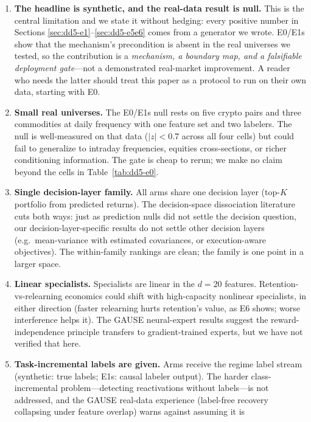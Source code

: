 \documentclass[11pt,a4paper]{article}
\theoremstyle{definition}
\theoremstyle{plain}
\begin{document}
\begin{enumerate}
\item \textbf{The headline is synthetic, and the real-data result is null.}
This is the central limitation and we state it without hedging: every
positive number in Sections \ref{sec:dd5-e1}--\ref{sec:dd5-e5e6} comes from
a generator we wrote. E0/E1s show that the mechanism's precondition is
absent in the real universes we tested, so the contribution is a
\emph{mechanism, a boundary map, and a falsifiable deployment gate}---not a
demonstrated real-market improvement. A reader who needs the latter should
treat this paper as a protocol to run on their own data, starting with E0.
\item \textbf{Small real universes.} The E0/E1s null rests on five crypto
pairs and three commodities at daily frequency with one feature set and two
labelers. The null is well-measured on that data ($|z| < 0.7$ across all
four cells) but could fail to generalize to intraday frequencies, equities
cross-sections, or richer conditioning information. The gate is cheap to
rerun; we make no claim beyond the cells in Table~\ref{tab:dd5-e0}.
\item \textbf{Single decision-layer family.} All arms share one decision
layer (top-$K$ portfolio from predicted returns). The decision-space
dissociation literature \citep{elmachtoub2022smart,yan2026invpnco} cuts
both ways: just as prediction nulls did not settle the decision question,
our decision-layer-specific results do not settle other decision layers
(e.g.\ mean-variance with estimated covariances, or execution-aware
objectives). The within-family rankings are clean; the family is one
point in a larger space.
\item \textbf{Linear specialists.} Specialists are linear in the $d = 20$
features. Retention-vs-relearning economics could shift with
high-capacity nonlinear specialists, in either direction (faster relearning
hurts retention's value, as E6 shows; worse interference helps it). The
GAUSE neural-expert results \citep{li2026gause} suggest the
reward-independence principle transfers to gradient-trained experts, but
we have not verified that here.
\item \textbf{Task-incremental labels are given.} Arms receive the regime
label stream (synthetic: true labels; E1s: causal labeler output). The
harder class-incremental problem---detecting reactivations without
labels---is not addressed, and the GAUSE real-data experience (label-free
recovery collapsing under feature overlap) warns against assuming it is

\end{enumerate}
\end{document}
